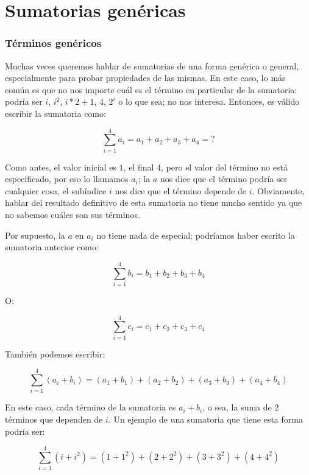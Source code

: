 \section{Sumatorias genéricas}

\subsubsection{Términos genéricos}
Muchas veces queremos hablar de sumatorias de una forma genérica o general, especialmente para probar propiedades de las mismas. En este caso, lo más común es que no nos importe cuál es el término en particular de la sumatoria: podría ser $i$, $i^2$, $i*2+1$, $4$, $2^i$ o lo que sea; no nos interesa. Entonces, es válido escribir la sumatoria como:

\begin{equation*}
	\sum_{i=1}^4{a_i} = a_1+a_2+a_3+a_4 = ?
\end{equation*}

Como antes, el valor inicial es $1$, el final $4$, pero el valor del término no está especificado, por eso lo llamamos $a_i$; la $a$ nos dice que el término podría ser cualquier cosa, el subíndice $i$ nos dice que el término depende de $i$. Obviamente, hablar del resultado definitivo de esta sumatoria no tiene mucho sentido ya que no sabemos cuáles son sus términos.

Por supuesto, la $a$ en $a_i$ no tiene nada de especial; podríamos haber escrito la sumatoria anterior como:

\begin{equation*}
	\sum_{i=1}^4{b_i} = b_1+b_2+b_3+b_4
\end{equation*}

O:

\begin{equation*}
	\sum_{i=1}^4{c_i} = c_1+c_2+c_3+c_4
\end{equation*}

También podemos escribir:

\begin{equation*}
	\sum_{i=1}^4{(a_i+b_i)} = (a_1+b_1)+(a_2+b_2)+(a_3+b_3)+(a_4+b_4)
\end{equation*}

En este caso, cada término de la sumatoria es $a_i+b_i$, o sea, la suma de 2 términos que dependen de $i$. Un ejemplo de una sumatoria que tiene esta forma podría ser:

\begin{equation*}
	\sum_{i=1}^4{(i+i^2)} = (1+1^2)+(2+2^2)+(3+3^2)+(4+4^2)
\end{equation*}

